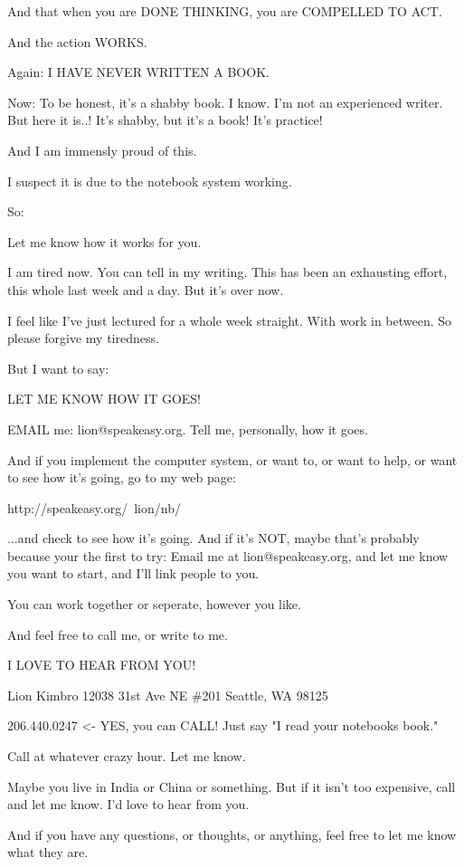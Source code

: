 \documentclass[oneside]{book}
\begin{document}
And that when you are DONE THINKING, you are COMPELLED TO ACT.

And the action WORKS.

Again: I HAVE NEVER WRITTEN A BOOK.

Now: To be honest, it's a shabby book. I know. I'm not an experienced
writer. But here it is..! It's shabby, but it's a book! It's practice!

And I am immensly proud of this.

I suspect it is due to the notebook system working.

So:

Let me know how it works for you.

I am tired now. You can tell in my writing. This has been an
exhausting effort, this whole last week and a day. But it's over now.

I feel like I've just lectured for a whole week straight. With work in
between. So please forgive my tiredness.

But I want to say:

LET ME KNOW HOW IT GOES!

EMAIL me: lion@speakeasy.org.
Tell me, personally, how it goes.

And if you implement the computer system, or want to, or want to help,
or want to see how it's going, go to my web page:

  http://speakeasy.org/~lion/nb/

...and check to see how it's going. And if it's NOT, maybe that's
probably because your the first to try: Email me at
lion@speakeasy.org, and let me know you want to start, and I'll link
people to you.

You can work together or seperate, however you like.

And feel free to call me, or write to me.

I LOVE TO HEAR FROM YOU!

  Lion Kimbro
  12038 31st Ave NE \#201
  Seattle, WA 98125

  206.440.0247  <- YES, you can CALL! Just say "I read your notebooks
                   book."

Call at whatever crazy hour.
Let me know.

Maybe you live in India or China or something. But if it isn't too
expensive, call and let me know. I'd love to hear from you.

And if you have any questions, or thoughts, or anything, feel free to
let me know what they are.
\end{document}
